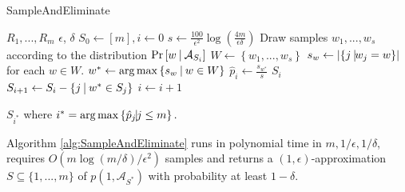 \documentclass[prodmode,acmec]{ec-acmsmall}
\begin{document}
\begin{algorithm}
\caption{SampleAndEliminate}
\begin{algorithmic}
 $R_1,...,R_m$ 
 $\epsilon$, $\delta$
 $S_0 \gets [m], i \gets 0$
\State $s \gets \frac{100}{\epsilon^2} \log \left(\frac{4m}{\epsilon\delta} \right)$
 Draw samples $w_1,...,w_s$ according to the distribution $\Pr\left[w~\vline~\mathcal{A}_{S_i}\right]$
\State $W \gets \left\{w_1,...,w_s\right\}$
\State $s_w \gets \left| \left\{j~\vline w_j = w \right\} \right|$ for each $w \in W$.
\State $w^* \gets \arg\max \left\{ s_w ~\vline~w \in W \right\}$
\State $\hat{p}_i \gets \frac{s_{w^*} }{ s }$ 
\Return $S_i$
 \Else 
 \State $S_{i+1} \gets S_i - \{j ~\vline ~w^* \in S_j\}$
  \State $i \gets i+1$

 \EndIf
\EndWhile
\Return $S_{i^*}$ where $i^* = \arg\max \left\{ \hat{p}_j \vline j \leq m \right\}.$ 
\end{algorithmic}
\label{alg:SampleAndEliminate}
\end{algorithm}

\begin{theorem}
Algorithm \ref{alg:SampleAndEliminate} runs in polynomial time in $m, 1/\epsilon,1/\delta$, requires $O\left(m \log \left(m/\delta \right)/\epsilon^2 \right)$ samples and returns a $(1,\epsilon)$-approximation $S \subseteq \{1,...,m\}$ of $p\left(1,\mathcal{A}_{S^*}\right)$ with probability at least $1-\delta$. 
\end{theorem}
\end{document}
